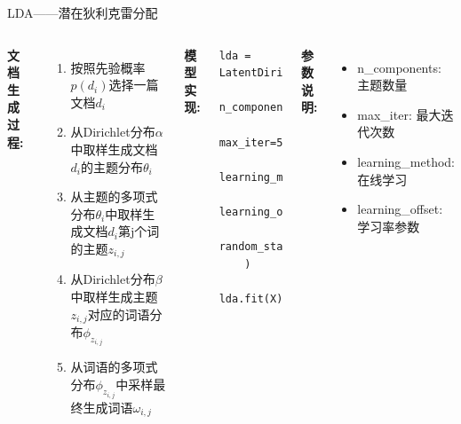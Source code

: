 \documentclass{beamer}
\begin{document}
\begin{frame}[fragile]{LDA——潜在狄利克雷分配}
    \begin{columns}
        \textbf{文档生成过程:}
        \vspace{0.2cm}
        \begin{enumerate}
            \item 按照先验概率$p(d_i)$选择一篇文档$d_i$
            \item 从Dirichlet分布$\alpha$中取样生成文档$d_i$的主题分布$\theta_i$
            \item 从主题的多项式分布$\theta_i$中取样生成文档$d_i$第j个词的主题$z_{i,j}$
            \item 从Dirichlet分布$\beta$中取样生成主题$z_{i,j}$对应的词语分布$\phi_{z_{i,j}}$
            \item 从词语的多项式分布$\phi_{z_{i,j}}$中采样最终生成词语$\omega_{i,j}$
        \end{enumerate}

        \textbf{模型实现:}
        \begin{lstlisting}[style=pythonstyle, basicstyle=\tiny]
    lda = LatentDirichletAllocation(
        n_components=15,
        max_iter=5,
        learning_method='online',
        learning_offset=50.,
        random_state=0
    )
    lda.fit(X)
        \end{lstlisting}
        \vspace{0.2cm}
        \textbf{参数说明:}
        \begin{itemize}
            \item n\_components: 主题数量
            \item max\_iter: 最大迭代次数
            \item learning\_method: 在线学习
            \item learning\_offset: 学习率参数
        \end{itemize}
    \end{columns}
\end{frame}
\end{document}
